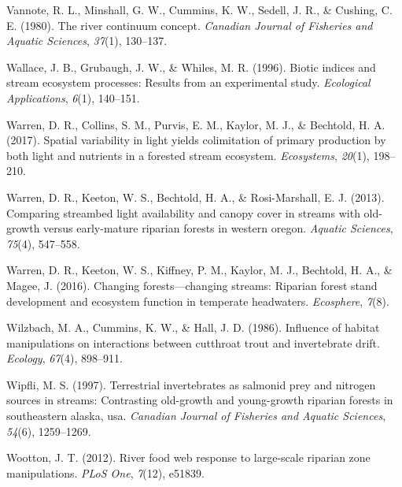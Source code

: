 \documentclass[double,12pt]{beavtex}
\begin{document}
  \hypertarget{ref-Vannote1980}{}
  Vannote, R. L., Minshall, G. W., Cummins, K. W., Sedell, J. R., \&
  Cushing, C. E. (1980). The river continuum concept. \emph{Canadian
  Journal of Fisheries and Aquatic Sciences}, \emph{37}(1), 130--137.
  
  \hypertarget{ref-Wallace1996}{}
  Wallace, J. B., Grubaugh, J. W., \& Whiles, M. R. (1996). Biotic indices
  and stream ecosystem processes: Results from an experimental study.
  \emph{Ecological Applications}, \emph{6}(1), 140--151.
  
  \hypertarget{ref-Warren2017}{}
  Warren, D. R., Collins, S. M., Purvis, E. M., Kaylor, M. J., \&
  Bechtold, H. A. (2017). Spatial variability in light yields colimitation
  of primary production by both light and nutrients in a forested stream
  ecosystem. \emph{Ecosystems}, \emph{20}(1), 198--210.
  
  \hypertarget{ref-Warren2013}{}
  Warren, D. R., Keeton, W. S., Bechtold, H. A., \& Rosi-Marshall, E. J.
  (2013). Comparing streambed light availability and canopy cover in
  streams with old-growth versus early-mature riparian forests in western
  oregon. \emph{Aquatic Sciences}, \emph{75}(4), 547--558.
  
  \hypertarget{ref-Warren2016Eco}{}
  Warren, D. R., Keeton, W. S., Kiffney, P. M., Kaylor, M. J., Bechtold,
  H. A., \& Magee, J. (2016). Changing forests---changing streams:
  Riparian forest stand development and ecosystem function in temperate
  headwaters. \emph{Ecosphere}, \emph{7}(8).
  
  \hypertarget{ref-Wilzbach1986}{}
  Wilzbach, M. A., Cummins, K. W., \& Hall, J. D. (1986). Influence of
  habitat manipulations on interactions between cutthroat trout and
  invertebrate drift. \emph{Ecology}, \emph{67}(4), 898--911.
  
  \hypertarget{ref-Wipfli1997}{}
  Wipfli, M. S. (1997). Terrestrial invertebrates as salmonid prey and
  nitrogen sources in streams: Contrasting old-growth and young-growth
  riparian forests in southeastern alaska, usa. \emph{Canadian Journal of
  Fisheries and Aquatic Sciences}, \emph{54}(6), 1259--1269.
  
  \hypertarget{ref-Wootton2012}{}
  Wootton, J. T. (2012). River food web response to large-scale riparian
  zone manipulations. \emph{PLoS One}, \emph{7}(12), e51839.
\end{document}
